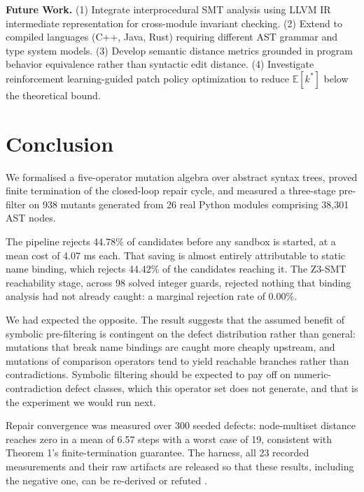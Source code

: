 \documentclass[10pt,twocolumn,letterpaper]{article}
\begin{document}
\textbf{Future Work.} (1) Integrate interprocedural SMT analysis using LLVM IR intermediate representation for cross-module invariant checking. (2) Extend to compiled languages (C++, Java, Rust) requiring different AST grammar and type system models. (3) Develop semantic distance metrics grounded in program behavior equivalence rather than syntactic edit distance. (4) Investigate reinforcement learning-guided patch policy optimization to reduce $\mathbb{E}[k^*]$ below the theoretical bound.




\section{Conclusion}


We formalised a five-operator mutation algebra over abstract syntax trees, proved finite termination of the closed-loop repair cycle, and measured a three-stage pre-filter on 938 mutants generated from 26 real Python modules comprising 38{,}301 AST nodes.

The pipeline rejects 44.78\% of candidates before any sandbox is started, at a mean cost of 4.07 ms each. That saving is almost entirely attributable to static name binding, which rejects 44.42\% of the candidates reaching it. The Z3-SMT reachability stage, across 98 solved integer guards, rejected nothing that binding analysis had not already caught: a marginal rejection rate of 0.00\%.

We had expected the opposite. The result suggests that the assumed benefit of symbolic pre-filtering is contingent on the defect distribution rather than general: mutations that break name bindings are caught more cheaply upstream, and mutations of comparison operators tend to yield reachable branches rather than contradictions. Symbolic filtering should be expected to pay off on numeric-contradiction defect classes, which this operator set does not generate, and that is the experiment we would run next.

Repair convergence was measured over 300 seeded defects: node-multiset distance reaches zero in a mean of 6.57 steps with a worst case of 19, consistent with Theorem 1's finite-termination guarantee. The harness, all 23 recorded measurements and their raw artifacts are released so that these results, including the negative one, can be re-derived or refuted \cite{arxiv_2501_02497,arxiv_2405_01543,crossref_10_1145_3689096_3689462}.
\end{document}
